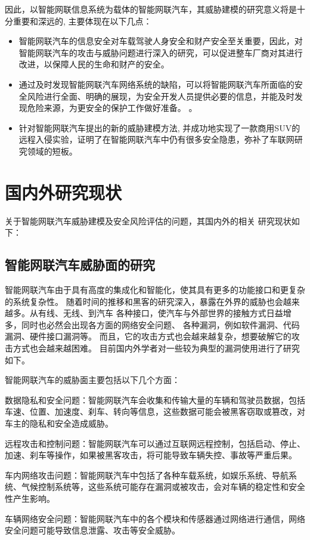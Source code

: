 因此，以智能网联信息系统为载体的智能网联汽车，其威胁建模的研究意义将是十分重要和深远的, 主要体现在以下几点：
\begin{itemize}
  \item 智能网联汽车的信息安全对车载驾驶人身安全和财产安全至关重要，因此，对智能网联汽车的攻击与威胁问题进行深入的研究，可以促进整车厂商对其进行改进，以保障人民的生命和财产的安全。
  \item 通过及时发现智能网联汽车网络系统的缺陷，可以将智能网联汽车所面临的安全风险进行全面、明确的展现，为安全开发人员提供必要的信息，并能及时发现危险来源，为更安全的保护工作做好准备。  。
  \item 针对智能网联汽车提出的新的威胁建模方法, 并成功地实现了一款商用SUV的远程入侵实验，证明了在智能网联汽车中仍有很多安全隐患，弥补了车联网研究领域的短板。  
\end{itemize}
\section{国内外研究现状}
关于智能网联汽车威胁建模及安全风险评估的问题，其国内外的相关
研究现状如下：

\subsection{智能网联汽车威胁面的研究}
智能网联汽车由于具有高度的集成化和智能化，使其具有更多的功能接口和更复杂的系统复杂性。
随着时间的推移和黑客的研究深入，暴露在外界的威胁也会越来越多。从有线、无线、到汽车
各种接口，使汽车与外部世界的接触方式日益增多，同时也必然会出现各方面的网络安全问题、
各种漏洞，例如软件漏洞、代码漏洞、硬件接口漏洞等。
而且，它的攻击方式也会越来越复杂，想要破解它的攻击方式也会越来越困难。
目前国内外学者对一些较为典型的漏洞使用进行了研究如下。

智能网联汽车的威胁面主要包括以下几个方面：

数据隐私和安全问题：智能网联汽车会收集和传输大量的车辆和驾驶员数据，包括车速、位置、加速度、刹车、转向等信息，这些数据可能会被黑客窃取或篡改，对车主的隐私和安全造成威胁。

远程攻击和控制问题：智能网联汽车可以通过互联网远程控制，包括启动、停止、加速、刹车等操作，如果被黑客攻击，将可能导致车辆失控、事故等严重后果。

车内网络攻击问题：智能网联汽车中包括了各种车载系统，如娱乐系统、导航系统、气候控制系统等，这些系统可能存在漏洞或被攻击，会对车辆的稳定性和安全性产生影响。

车辆网络安全问题：智能网联汽车中的各个模块和传感器通过网络进行通信，网络安全问题可能导致信息泄露、攻击等安全威胁。


